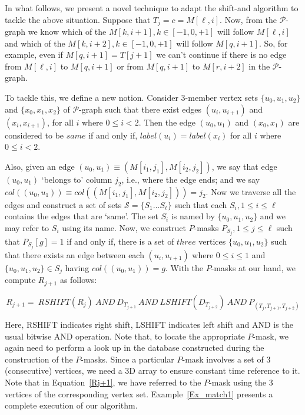 \documentclass{llncs}
\begin{document}
{In what follows, we present a novel technique to adapt the shift-and algorithm to tackle the above situation. Suppose that $T_j = c = M[\ell,i]$. Now, from the $\mathcal P$-graph we know which
of the $M[k,i+1], k\in[-1,0,+1]$ will follow $M[\ell,i]$ and which
of the $M[k,i+2], k\in[-1,0,+1]$ will follow $M[q,i+1]$. So, for
example, even if $M[q,i+1] = T[j+1]$ we can't continue if there is 
no edge from $M[\ell,i]$ to $M[q,i+1]$ or from $M[q,i+1]$ to $M[r,i+2]$ in the $\mathcal P$-graph. 


To tackle this, we define a new notion. Consider 3-member vertex sets $\{u_0,u_1,u_2\}$ and $\{x_0,x_1,x_2\}$ of $\mathcal P$-graph such that there exist edges $(u_{i},u_{i+1})$ and $(x_{i},x_{i+1})$, for all $i$ where $0 \leq i < 2$. Then the edge $(u_0,u_1)$ and $(x_0,x_1)$ are considered to be $same$ if and only if, $label(u_{i})=label(x_{i})$ for all $i$ where $0 \leq i < 2$.


Also, given an edge $(u_0,u_1) \equiv (M[i_1,j_1],M[i_2,j_2])$, we say
that edge $(u_0,u_1)$ `belongs to' column $j_2$, i.e., where the edge
ends; and we say $col((u_0,u_1)) \equiv col((M[i_1,j_1],M[i_2,j_2])) =
j_2$. Now we traverse all the edges and construct a set of sets
$\mathcal S = \{S_1\ldots S_\ell\}$ such that each $S_i, 1\leq i\leq
\ell$ contains the edges that are `same'. The set $S_i$ is named by
$\{u_0,u_1,u_2\}$ and we may refer to $S_i$
using its name. Now, we construct $P$-masks $P_{S_j}, 1\leq j\leq \ell$ such that $P_{S_j}[g] = 1$ if and only if, there is a set of $three$ vertices $\{u_0,u_1,u_2\}$ such that there exists an edge between each $(u_{i},u_{i+1})$ where $0 \leq i \leq 1$ and $\{u_0,u_1,u_2\}\in S_{j}$ having $col((u_0,u_1)) = g$. With the $P$-masks at our hand, we compute $R_{j+1}$ as follows:

\begin{equation}\label{Rj+1}
R_{j+1}=~ RSHIFT(R_j)~ AND~ D_{T_{j+1}} ~ AND~ LSHIFT(D_{T_{j+2}})~ AND~ P_{(T_j,T_{j+1},T_{j+2})}
\end{equation}

Here, RSHIFT indicates right shift, LSHIFT indicates left shift and AND is the usual bitwise AND operation. Note that, to locate the appropriate $P$-mask, we again need to perform a look up in the database constructed during the construction of the $P$-masks. Since a particular $P$-mask involves a set of $3$ (consecutive) vertices, we need a $3$D array to ensure constant time reference to it. Note that in Equation~\ref{Rj+1}, we have referred to the $P$-mask using the $3$ vertices of the corresponding vertex set. Example~\ref{Ex_match1} presents a complete execution of our algorithm.

}
\end{document}
